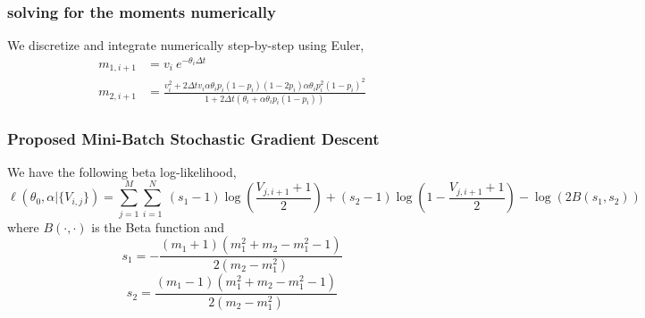 \documentclass[aspectratio=169]{beamer}\usepackage[utf8]{inputenc}
\begin{document}
\begin{frame}\frametitle{ solving for the moments numerically }
We discretize and integrate numerically step-by-step using  Euler,
\begin{align*}
  m_{1,i+1}&= v_i \ e^{ - \theta_i \Delta t} \\
  m_{2,i+1} &= \frac{v_i^2  + 2 \Delta t v_i  \alpha \theta_i p_i (1-p_i)(1-2p_i)  \alpha \theta_i p_i^2 (1-p_i)^2}{1+ 2 \Delta t (\theta_i + \alpha \theta_i p_i (1-p_i))}
\end{align*}
\end{frame}

\begin{frame}\frametitle{ Proposed Mini-Batch Stochastic Gradient Descent }
We have the following beta log-likelihood,
\begin{equation*}
\ell ( \theta_0 , \alpha | \{V_{i,j}\}) = \sum\limits_{j=1}^M \sum\limits_{i=1}^N \ (s_1 -1 ) \log \left( \frac{V_{j,i+1}+1}{2} \right) +  (s_2 -1 ) \log \left( 1 - \frac{V_{j,i+1}+1}{2} \right) - \log\left( 2 B(s_1, s_2) \right)
\end{equation*}
where $B(\cdot, \cdot)$ is the Beta function and
\begin{equation}
s_1 = - \frac{ (m_1+1)(m_1^2 + m_2 - m_1^2  -1 )}{2(m_2 - m_1^2)}
\end{equation}
\begin{equation}
s_2 = \frac{(m_1-1)(m_1^2 + m_2 - m_1^2  -1 )}{2(m_2 - m_1^2)}
\end{equation}
\end{frame}
\end{document}
